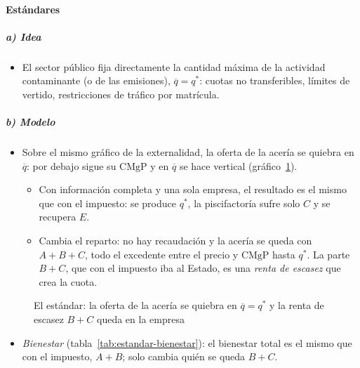 \documentclass[11pt]{article}
\begin{document}
\paragraph{Estándares}

\subparagraph{a) Idea}
\begin{itemize}
\item El sector público fija directamente la cantidad máxima de la actividad contaminante (o de las emisiones), $\overline{q}=q^*$: cuotas no transferibles, límites de vertido, restricciones de tráfico por matrícula.
\end{itemize}

\subparagraph{b) Modelo}
\begin{itemize}
\item Sobre el mismo gráfico de la externalidad, la oferta de la acería se quiebra en $\overline{q}$: por debajo sigue su $\mathrm{CMgP}$ y en $\overline{q}$ se hace vertical (gráfico~\ref{fig:externalidad-estandar}).
  \begin{itemize}
  \item Con información completa y una sola empresa, el resultado es el mismo que con el impuesto: se produce $q^*$, la piscifactoría sufre solo $C$ y se recupera $E$.
  \item Cambia el reparto: no hay recaudación y la acería se queda con $A+B+C$, todo el excedente entre el precio y $\mathrm{CMgP}$ hasta $q^*$. La parte $B+C$, que con el impuesto iba al Estado, es una \emph{renta de escasez} que crea la cuota.
  \end{itemize}
\end{itemize}

\begin{figure}[H]
\centering
\caption{El estándar: la oferta de la acería se quiebra en $\overline{q}=q^*$ y la renta de escasez $B+C$ queda en la empresa}\label{fig:externalidad-estandar}
\end{figure}

\begin{itemize}
\item \emph{Bienestar} (tabla~\ref{tab:estandar-bienestar}): el bienestar total es el mismo que con el impuesto, $A+B$; solo cambia quién se queda $B+C$.
\end{itemize}
\end{document}
